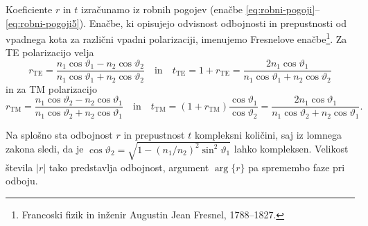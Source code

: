 Koeficiente $r$ in $t$ izračunamo iz robnih pogojev (enačbe 
\ref{eq:robni-pogoji}--\ref{eq:robni-pogoji5}). Enačbe, ki opisujejo odvisnost odbojnosti
in prepustnosti od vpadnega kota za različni vpadni polarizaciji, imenujemo
Fresnelove enačbe\footnote{Francoski fizik in inženir 
Augustin Jean Fresnel, 1788--1827.}. Za TE polarizacijo velja 
\begin{equation}
r_{\mathrm{TE}}=\frac{n_{1}\cos\vartheta_{1}-n_{2}\cos\vartheta_{2}}{n_{1}\cos\vartheta_{1}+
n_{2}\cos\vartheta_{2}}
\label{eq:Fresnel1} \quad \mathrm{in} \quad
t_{\mathrm{TE}}=1+r_{\mathrm{TE}}=\frac{2n_{1}\cos\vartheta_{1}}{n_{1}\cos\vartheta_{1}+
n_{2}\cos\vartheta_{2}}
\end{equation}
in za TM polarizacijo
\begin{equation}
r_{\mathrm{TM}}=\frac{n_{1}\cos\vartheta_{2}-n_{2}\cos\vartheta_{1}}{n_{1}\cos\vartheta_{2}+
n_{2}\cos\vartheta_{1}}
\quad \mathrm{in} \quad 
t_{\mathrm{TM}}=(1+r_{\mathrm{TM}})\frac{\cos\vartheta_{1}}{\cos\vartheta_{2}}=
\frac{2n_{1}\cos\vartheta_{1}}
{n_{1}\cos\vartheta_{2}+n_{2}\cos\vartheta_{1}}.
\label{eq:Fresnel2}
\end{equation}

Na splošno sta odbojnost $r$ in prepustnost $t$ kompleksni
količini, saj iz lomnega zakona sledi, da je $\cos\vartheta_{2}=
\sqrt{1-\left(n_{1}/n_{2}\right)^{2}\sin^{2}\vartheta_{1}}$
lahko kompleksen. Velikost števila $\left|r\right|$ tako predstavlja
odbojnost, argument $\arg\{r\}$ pa spremembo faze
pri odboju.

